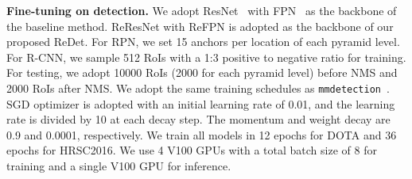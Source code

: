 \documentclass[final]{cvpr}
\begin{document}
{{\bf Fine-tuning on detection.} We adopt ResNet~\cite{he2016resnet} with FPN~\cite{lin2017feature} as the backbone of the baseline method. ReResNet with ReFPN is adopted as the backbone of our proposed ReDet.
For RPN, we set 15 anchors per location of each pyramid level. For R-CNN, we sample 512 RoIs with a 1:3 positive to negative ratio for training. For testing, we adopt 10000 RoIs (2000 for each pyramid level) before NMS and 2000 RoIs after NMS.
We adopt the same training schedules as \texttt{mmdetection}~\cite{chen2019mmdetection}. SGD optimizer is adopted with an initial learning rate of 0.01, and the learning rate is divided by 10 at each decay step. The momentum and weight decay are 0.9 and 0.0001, respectively. 
We train all models in 12 epochs for DOTA and 36 epochs for HRSC2016. We use 4 V100 GPUs with a total batch size of 8 for training and a single V100 GPU for inference.


\begin{table}
   \begin{center}
\small
{}
\end{center}    \vspace{-3mm}
   \caption{\textbf{Performance comparisons of the rotation-equivariant backbone on classification (cls.) and detection (det.)}. group indicates the rotation group that the backbone is equivariant to. We report the top-1 accuracy on ILSVRC 2012 without FPN and the detection performance on DOTA-v1.5 test set in terms of mAP. The model size only includes the size of the backbone.}
   \vspace{-1mm}
   \label{tab:re_backbone}
\end{table}

}
\end{document}

